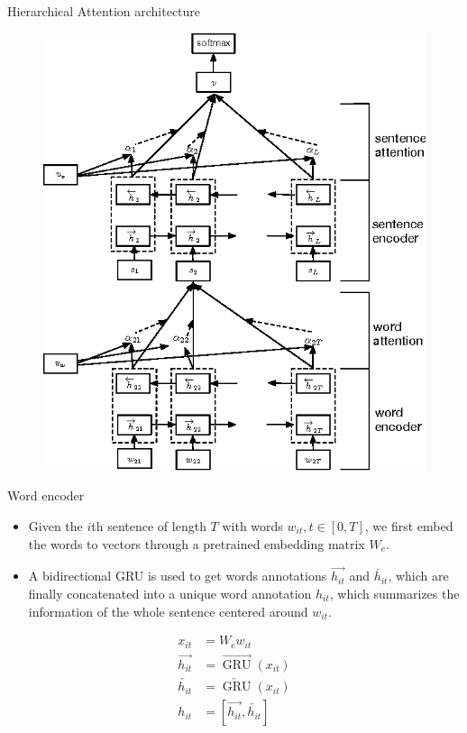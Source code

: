 \documentclass[10pt]{beamer}
\begin{document}
\begin{frame}{Hierarchical Attention architecture}

\begin{figure}[H]
\centering
\includegraphics[scale=0.3]{img/hier_attn.png}
\label{graph_plot}
\end{figure}

\end{frame}


\begin{frame}{Word encoder}

\begin{itemize}
\item
Given the $i$th sentence of length $T$ with words $w_{it}, t \in [0,T]$, we first embed the words to vectors through a pretrained embedding matrix $W_e$.
\item
A bidirectional GRU is used to get words annotations $\overrightarrow{h_{it}}$ and $\overleftarrow{h_{it}}$, which are finally concatenated into a unique word annotation $h_{it}$, which summarizes the information of the whole sentence centered around $w_{it}$.\\
\end{itemize}
\begin{align*}
x_{it} &= W_ew_{it} \\
\overrightarrow{h_{it}} &= \overrightarrow{\operatorname{GRU}}(x_{it}) \\
\overleftarrow{h_{it}} &= \overleftarrow{\operatorname{GRU}}(x_{it}) \\
h_{it} &= [\overrightarrow{h_{it}}, \overleftarrow{h_{it}}]
\end{align*}

\end{frame}
\end{document}
